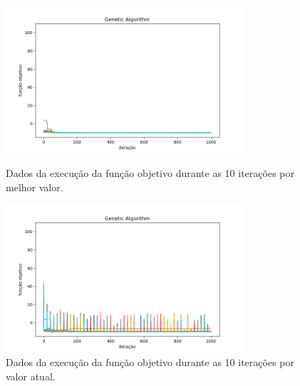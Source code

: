 \begin{figure}[H]
\centering
  \begin{minipage}[b]{0.48\textwidth}
    \includegraphics[width=88mm]{imagens/otima/problema-1-genetic-algorithm-funcao-objetivo-best.png}
    \caption{Dados da execução da função objetivo durante as 10 iterações por melhor valor.
    \label{fig:problema-1-genetic-algorithm-funcao-objetivo-best}}
  \end{minipage}
  \hfill
  \begin{minipage}[b]{0.48\textwidth}
    \includegraphics[width=88mm]{imagens/otima/problema-1-genetic-algorithm-funcao-objetivo-value.png}
    \caption{Dados da execução da função objetivo durante as 10 iterações por valor atual.
    \label{fig:problema-1-genetic-algorithm-funcao-objetivo-value}}
  \end{minipage}
\end{figure}